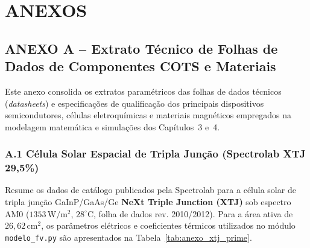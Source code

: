 
\newpage
\section*{ANEXOS}

\subsection*{ANEXO A -- Extrato Técnico de Folhas de Dados de Componentes COTS e Materiais}

Este anexo consolida os extratos paramétricos das folhas de dados técnicos (\textit{datasheets}) e especificações de qualificação dos principais dispositivos semicondutores, células eletroquímicas e materiais magnéticos empregados na modelagem matemática e simulações dos Capítulos~3 e~4.

\subsubsection*{A.1 Célula Solar Espacial de Tripla Junção (Spectrolab XTJ 29,5\%)}
Resume os dados de catálogo publicados pela Spectrolab para a célula solar de tripla junção GaInP/GaAs/Ge \textbf{NeXt Triple Junction (XTJ)} sob espectro AM0 ($1353\,\mathrm{W/m^2}$, $28^\circ\text{C}$, folha de dados rev. 2010/2012). Para a área ativa de $26{,}62\,\mathrm{cm^2}$, os parâmetros elétricos e coeficientes térmicos utilizados no módulo \texttt{modelo\_fv.py} são apresentados na Tabela~\ref{tab:anexo_xtj_prime}.

